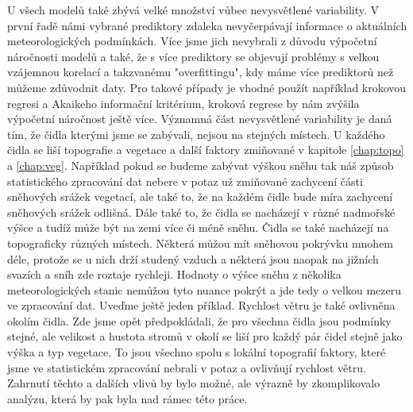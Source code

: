 U všech modelů také zbývá velké množství vůbec nevysvětlené variability. V první řadě námi vybrané prediktory zdaleka nevyčerpávají informace o aktuálních meteorologických podmínkách. Více jsme jich nevybrali z důvodu výpočetní náročnosti modelů a také, že s více prediktory se objevují problémy s velkou vzájemnou korelací a takzvanému "overfittingu", kdy máme více prediktorů než můžeme zdůvodnit daty. Pro takové případy je vhodné použít například krokovou regresi a Akaikeho informační kritérium, kroková regrese by nám zvýšila výpočetní náročnost ještě více. Významná část nevysvětlené variability je daná tím, že čidla kterými jsme se zabývali, nejsou na stejných místech. U každého čidla se liší topografie a vegetace a další faktory zmiňované v kapitole \ref{chap:topo} a \ref{chap:veg}. Například pokud se budeme zabývat výškou sněhu tak náš způsob statistického zpracování dat nebere v potaz už zmiňované zachycení části sněhových srážek vegetací, ale také to, že na každém čidle bude míra zachycení sněhových srážek odlišná. Dále také to, že čidla se nacházejí v různé nadmořské výšce a tudíž může být na zemi více či méně sněhu. Čidla se také nacházejí na topograficky různých místech. Některá můžou mít sněhovou pokrývku mnohem déle, protože se u nich drží studený vzduch a některá jsou naopak na jižních svazích a sníh zde roztaje rychleji. Hodnoty o výšce sněhu z několika meteorologických stanic nemůžou tyto nuance pokrýt a jde tedy o velkou mezeru ve zpracování dat. Uveďme ještě jeden příklad. Rychlost větru je také ovlivněna okolím čidla. Zde jsme opět předpokládali, že pro všechna čidla jsou podmínky stejné, ale velikost a hustota stromů v okolí se liší pro každý pár čidel stejně jako výška a typ vegetace. To jsou všechno spolu s lokální topografií faktory, které jsme ve statistickém zpracování nebrali v potaz a ovlivňují rychlost větru. Zahrnutí těchto a dalších vlivů by bylo možné, ale výrazně by zkomplikovalo analýzu, která by pak byla nad rámec této práce.
